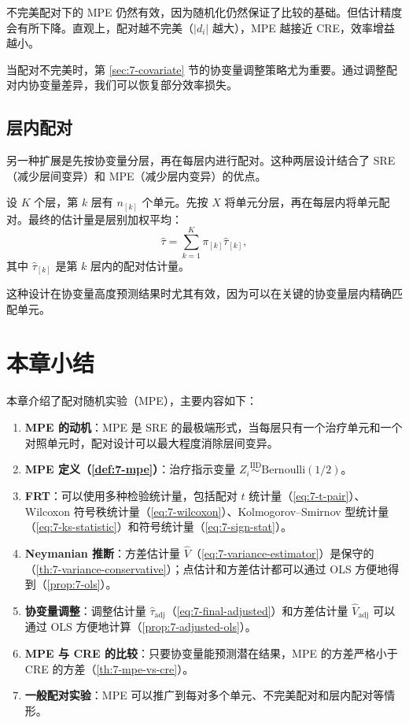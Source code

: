 不完美配对下的 MPE 仍然有效，因为随机化仍然保证了比较的基础。但估计精度会有所下降。直观上，配对越不完美（$|d_i|$ 越大），MPE 越接近 CRE，效率增益越小。

\begin{Remark}
当配对不完美时，第 \ref{sec:7-covariate} 节的协变量调整策略尤为重要。通过调整配对内协变量差异，我们可以恢复部分效率损失。
\end{Remark}

\subsection{层内配对}\label{sec:7-stratified-pairing}

另一种扩展是先按协变量分层，再在每层内进行配对。这种两层设计结合了 SRE（减少层间变异）和 MPE（减少层内变异）的优点。

设 $K$ 个层，第 $k$ 层有 $n_{[k]}$ 个单元。先按 $X$ 将单元分层，再在每层内将单元配对。最终的估计量是层别加权平均：
\[
\hat\tau = \sum_{k=1}^K \pi_{[k]} \hat\tau_{[k]},
\]
其中 $\hat\tau_{[k]}$ 是第 $k$ 层内的配对估计量。

这种设计在协变量高度预测结果时尤其有效，因为可以在关键的协变量层内精确匹配单元。

\section{本章小结}\label{sec:7-summary}

本章介绍了配对随机实验（MPE），主要内容如下：

\begin{enumerate}
  \item \textbf{MPE 的动机}：MPE 是 SRE 的最极端形式，当每层只有一个治疗单元和一个对照单元时，配对设计可以最大程度消除层间变异。
  \item \textbf{MPE 定义（\cref{def:7-mpe}）}：治疗指示变量 $Z_i \stackrel{\text{IID}}{\sim} \text{Bernoulli}(1/2)$。
  \item \textbf{FRT}：可以使用多种检验统计量，包括配对 $t$ 统计量（\cref{eq:7-t-pair}）、Wilcoxon 符号秩统计量（\cref{eq:7-wilcoxon}）、Kolmogorov--Smirnov 型统计量（\cref{eq:7-ks-statistic}）和符号统计量（\cref{eq:7-sign-stat}）。
  \item \textbf{Neymanian 推断}：方差估计量 $\hat V$（\cref{eq:7-variance-estimator}）是保守的（\cref{th:7-variance-conservative}）；点估计和方差估计都可以通过 OLS 方便地得到（\cref{prop:7-ols}）。
  \item \textbf{协变量调整}：调整估计量 $\hat\tau_{\text{adj}}$（\cref{eq:7-final-adjusted}）和方差估计量 $\hat V_{\text{adj}}$ 可以通过 OLS 方便地计算（\cref{prop:7-adjusted-ols}）。
  \item \textbf{MPE 与 CRE 的比较}：只要协变量能预测潜在结果，MPE 的方差严格小于 CRE 的方差（\cref{th:7-mpe-vs-cre}）。
  \item \textbf{一般配对实验}：MPE 可以推广到每对多个单元、不完美配对和层内配对等情形。
\end{enumerate}

